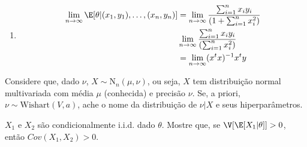 {\begin{enumerate}[label=(\alph*)]
\begin{align*}
  \end{align*}
  \item 
  \begin{align*}
   \lim_{n \rightarrow \infty}
   \E[\theta|(x_{1},y_{1}),\ldots,(x_{n},y_{n})]
   &= \lim_{n \rightarrow \infty} \frac{\sum_{i=1}^{n}{x_{i}y_{i}}}{\left(1+\sum_{i=1}^{n}{x_{i}^{2}}\right)} \\
   & \lim_{n \rightarrow \infty} \frac{\sum_{i=1}^{n}{x_{i}y_{i}}}{\left(\sum_{i=1}^{n}{x_{i}^{2}}\right)}	\\
   &= \lim_{n \rightarrow \infty} (x^{t}x)^{-1}x^{t}y
  \end{align*}
 \end{enumerate}
}{}

\begin{exercise}
 Considere que, dado $\nu$,
 $X \sim \text{N}_{n}(\mu, \nu)$, ou seja,
 $X$ tem distribuição normal multivariada
 com média $\mu$ (conhecida) e precisão $\nu$.
 Se, a priori, $\nu \sim \text{Wishart}(V,a)$,
 ache o nome da distribuição de $\nu|X$ e
 seus hiperparâmetros.
\end{exercise}


\begin{exercise}
 $X_{1}$ e $X_{2}$ são condicionalmente i.i.d.
 dado $\theta$. Mostre que, se $\V[\E[X_{1}|\theta]] > 0$,
 então $Cov(X_{1},X_{2}) > 0$.
\end{exercise}




